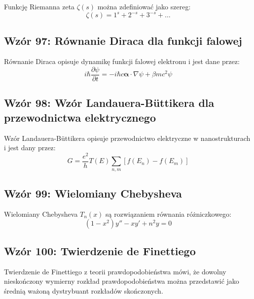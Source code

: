 \documentclass{article}
\begin{document}
Funkcję Riemanna zeta \(\zeta(s)\) można zdefiniować jako szereg:
\[ \zeta(s) = 1^s + 2^{-s} + 3^{-s} + \ldots \]

\subsection*{Wzór 97: Równanie Diraca dla funkcji falowej}

Równanie Diraca opisuje dynamikę funkcji falowej elektronu i jest dane przez:
\[ i\hbar\frac{\partial \psi}{\partial t} = -i\hbar c\boldsymbol{\alpha}\cdot\nabla\psi + \beta mc^2\psi \]

\subsection*{Wzór 98: Wzór Landauera-Büttikera dla przewodnictwa elektrycznego}

Wzór Landauera-Büttikera opisuje przewodnictwo elektryczne w nanostrukturach i jest dany przez:
\[ G = \frac{e^2}{h}T(E) \sum_{n,m} \left[f(E_n) - f(E_m)\right] \]

\subsection*{Wzór 99: Wielomiany Chebysheva}

Wielomiany Chebysheva \(T_n(x)\) są rozwiązaniem równania różniczkowego:
\[ (1-x^2) y'' - xy' + n^2y = 0 \]

\subsection*{Wzór 100: Twierdzenie de Finettiego}

Twierdzenie de Finettiego z teorii prawdopodobieństwa mówi, że dowolny nieskończony wymierny rozkład prawdopodobieństwa można przedstawić jako średnią ważoną dystrybuant rozkładów skończonych.
\end{document}
